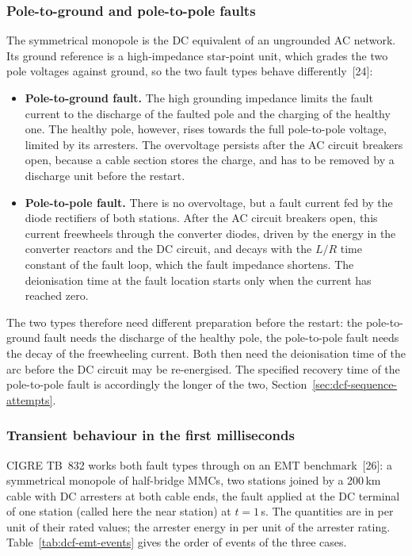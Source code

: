 \subsubsection{Pole-to-ground and pole-to-pole faults}
\label{sec:dcf-faults-types}

The symmetrical monopole is the DC equivalent of an ungrounded AC network.
Its ground reference is a high-impedance star-point unit, which grades the
two pole voltages against ground, so the two fault types behave
differently~[24]:

\begin{itemize}[itemsep=0.2em]
  \item \textbf{Pole-to-ground fault.} The high grounding impedance limits
        the fault current to the discharge of the faulted pole and the
        charging of the healthy one. The healthy pole, however, rises
        towards the full pole-to-pole voltage, limited by its arresters.
        The overvoltage persists after the AC circuit breakers open, because
        a cable section stores the charge, and has to be removed by a
        discharge unit before the restart.
  \item \textbf{Pole-to-pole fault.} There is no overvoltage, but a fault
        current fed by the diode rectifiers of both stations. After the AC
        circuit breakers open, this current freewheels through the converter
        diodes, driven by the energy in the converter reactors and the DC
        circuit, and decays with the $L/R$ time constant of the fault loop,
        which the fault impedance shortens. The deionisation time at the
        fault location starts only when the current has reached zero.
\end{itemize}

The two types therefore need different preparation before the restart: the
pole-to-ground fault needs the discharge of the healthy pole, the
pole-to-pole fault needs the decay of the freewheeling current. Both then
need the deionisation time of the arc before the DC circuit may be
re-energised. The specified recovery time of the pole-to-pole fault is
accordingly the longer of the two, Section~\ref{sec:dcf-sequence-attempts}.

\subsubsection{Transient behaviour in the first milliseconds}
\label{sec:dcf-faults-transient}

CIGRE TB~832 works both fault types through on an EMT benchmark~[26]: a
symmetrical monopole of half-bridge MMCs, two stations joined by a 200\,km
cable with DC arresters at both cable ends, the fault applied at the DC
terminal of one station (called here the near station) at $t = 1$\,s. The
quantities are in per unit of their rated values; the arrester energy in
per unit of the arrester rating. Table~\ref{tab:dcf-emt-events} gives the
order of events of the three cases.

